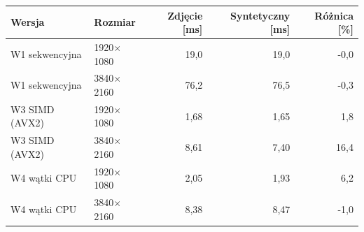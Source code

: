 \begin{tabular}{llrrr}
\toprule
Wersja & Rozmiar & Zdjęcie [ms] & Syntetyczny [ms] & Różnica [\%] \\
\midrule
W1 sekwencyjna & 1920$\times$1080 & 19,0 & 19,0 & -0,0 \\
W1 sekwencyjna & 3840$\times$2160 & 76,2 & 76,5 & -0,3 \\
W3 SIMD (AVX2) & 1920$\times$1080 & 1,68 & 1,65 & 1,8 \\
W3 SIMD (AVX2) & 3840$\times$2160 & 8,61 & 7,40 & 16,4 \\
W4 wątki CPU & 1920$\times$1080 & 2,05 & 1,93 & 6,2 \\
W4 wątki CPU & 3840$\times$2160 & 8,38 & 8,47 & -1,0 \\
\bottomrule
\end{tabular}
